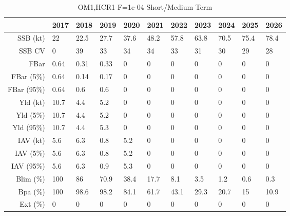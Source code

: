 \begin{table}[ht]
\centering
\begin{tabular}{rllllllllll}
  \hline
 & 2017 & 2018 & 2019 & 2020 & 2021 & 2022 & 2023 & 2024 & 2025 & 2026 \\ 
  \hline
SSB (kt) & 22 & 22.5 & 27.7 & 37.6 & 48.2 & 57.8 & 63.8 & 70.5 & 75.4 & 78.4 \\ 
  SSB CV & 0 & 39 & 33 & 34 & 34 & 33 & 31 & 30 & 29 & 28 \\ 
   \hline
FBar & 0.64 & 0.31 & 0.33 & 0 & 0 & 0 & 0 & 0 & 0 & 0 \\ 
  FBar (5\%) & 0.64 & 0.14 & 0.17 & 0 & 0 & 0 & 0 & 0 & 0 & 0 \\ 
  FBar (95\%) & 0.64 & 0.6 & 0.6 & 0 & 0 & 0 & 0 & 0 & 0 & 0 \\ 
   \hline
Yld (kt) & 10.7 & 4.4 & 5.2 & 0 & 0 & 0 & 0 & 0 & 0 & 0 \\ 
  Yld (5\%) & 10.7 & 4.4 & 5.2 & 0 & 0 & 0 & 0 & 0 & 0 & 0 \\ 
  Yld (95\%) & 10.7 & 4.4 & 5.3 & 0 & 0 & 0 & 0 & 0 & 0 & 0 \\ 
   \hline
IAV (kt) & 5.6 & 6.3 & 0.8 & 5.2 & 0 & 0 & 0 & 0 & 0 & 0 \\ 
  IAV (5\%) & 5.6 & 6.3 & 0.8 & 5.2 & 0 & 0 & 0 & 0 & 0 & 0 \\ 
  IAV (95\%) & 5.6 & 6.3 & 0.9 & 5.3 & 0 & 0 & 0 & 0 & 0 & 0 \\ 
   \hline
Blim (\%) & \cellcolor{red}100 & \cellcolor{red}86 & \cellcolor{red}70.9 & \cellcolor{red}38.4 & \cellcolor{red}17.7 & \cellcolor{red}8.1 & \cellcolor{green}3.5 & \cellcolor{green}1.2 & \cellcolor{green}0.6 & \cellcolor{green}0.3 \\ 
  Bpa (\%) & 100 & 98.6 & 98.2 & 84.1 & 61.7 & 43.1 & 29.3 & 20.7 & 15 & 10.9 \\ 
  Ext (\%) & 0 & 0 & 0 & 0 & 0 & 0 & 0 & 0 & 0 & 0 \\ 
   \hline
\end{tabular}
\caption{OM1,HCR1 F=1e-04 Short/Medium Term} 
\end{table}

